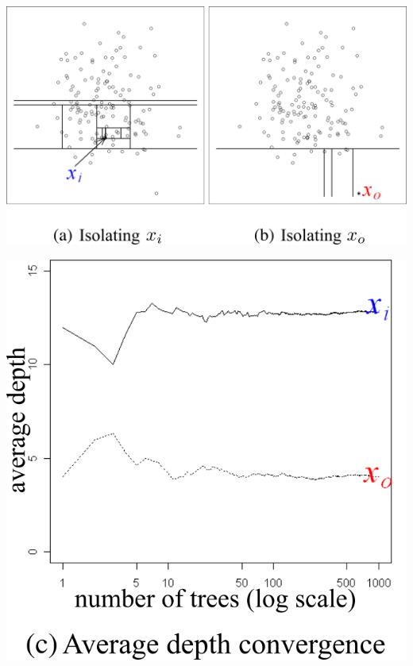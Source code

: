 \begin{minipage}{0.52\linewidth}
\centering
\includegraphics[scale=.95]{fig_source/ideeIF}
\label{fig:ideeIF}
\end{minipage}\hfill
\begin{minipage}{0.52\linewidth}
\centering
\includegraphics[scale=.95]{fig_source/convergenceIF}
\label{fig:convergenceIF}
\end{minipage}


